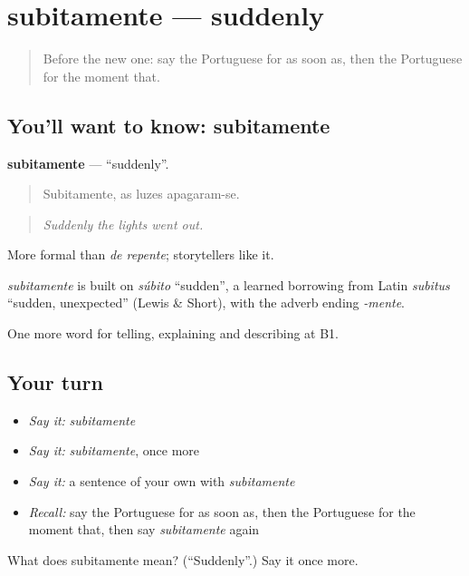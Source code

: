 \section[subitamente]{subitamente — suddenly}

\label{lesson:PT-C270-subitamente}



\begin{quote}
Before the new one: say the Portuguese for as soon as, then the Portuguese for the moment that.
\end{quote}

\subsection*{You'll want to know: subitamente}
\textbf{subitamente} — \textquotedblleft{}suddenly\textquotedblright{}.

\begin{quote}
Subitamente, as luzes apagaram-se.
\end{quote}

\begin{quote}
\emph{Suddenly the lights went out.}
\end{quote}

More formal than \emph{de repente}; storytellers like it.

\begin{cousinweb}
\emph{subitamente} is built on \emph{súbito} \textquotedblleft{}sudden\textquotedblright{}, a learned borrowing from Latin \emph{subitus} \textquotedblleft{}sudden, unexpected\textquotedblright{} (Lewis \& Short), with the adverb ending \emph{-mente}.
\end{cousinweb}

\begin{grammarlens}[title={What you've built}]
One more word for telling, explaining and describing at B1.
\end{grammarlens}

\subsection*{Your turn}
\begin{itemize}
\raggedright
  \item \emph{Say it:} \emph{subitamente}
  \item \emph{Say it:} \emph{subitamente}, once more
  \item \emph{Say it:} a sentence of your own with \emph{subitamente}
  \item \emph{Recall:} say the Portuguese for as soon as, then the Portuguese for the moment that, then say \emph{subitamente} again
\end{itemize}

\begin{tcolorbox}[breakable,colback=teal!4,colframe=teal!35!black,title={Before you move on}]
What does subitamente mean? (\textquotedblleft{}Suddenly\textquotedblright{}.) Say it once more.
\end{tcolorbox}
